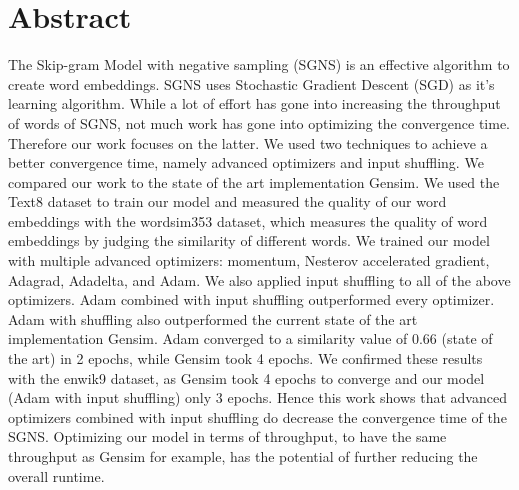 \chapter*{Abstract}
The Skip-gram Model with negative sampling (SGNS) is an effective algorithm to create word embeddings. SGNS  uses Stochastic Gradient Descent (SGD) as it's learning algorithm. While a lot of effort has gone into increasing the throughput of words of SGNS, not much work has gone into optimizing the convergence time. Therefore our work focuses on the latter. We used two techniques to achieve a better convergence time, namely advanced optimizers and input shuffling. We compared our work to the state of the art implementation Gensim. We used the Text8 dataset to train our model and measured the quality of our word embeddings with the wordsim353 dataset, which measures the quality of word embeddings by judging the similarity of different words. We trained our model with multiple advanced optimizers: momentum, Nesterov accelerated gradient, Adagrad, Adadelta, and Adam. We also applied input shuffling to all of the above optimizers. Adam combined with input shuffling outperformed every optimizer. Adam with shuffling also outperformed the current state of the art implementation Gensim. Adam converged to a similarity value of 0.66 (state of the art) in 2 epochs, while Gensim took 4 epochs. We confirmed these results with the enwik9 dataset, as Gensim took 4 epochs to converge and our model (Adam with input shuffling) only 3 epochs. Hence this work shows that advanced optimizers combined with input shuffling do decrease the convergence time of the SGNS. Optimizing our model in terms of throughput, to have the same throughput as Gensim for example, has the potential of further reducing the overall runtime.

